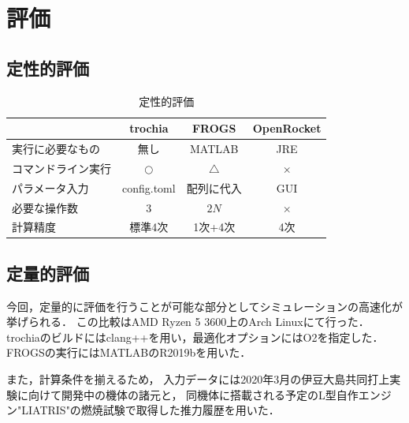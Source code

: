 \documentclass[a4j,10pt]{jsarticle}
\begin{document}


\section{評価}
\subsection{定性的評価}

\begin{table}[htbp]
  \hspace*{-2cm}
  \begin{tabular}{|l|c|c|c|} \hline
         & trochia & FROGS & OpenRocket \\ \hline
	実行に必要なもの & 無し & MATLAB & JRE \\
    コマンドライン実行 & $\bigcirc$ & $\bigtriangleup$ & $\times$ \\
    パラメータ入力 & config.toml & 配列に代入 & GUI \\
	必要な操作数 & $3$ & $2N$ & $\times$ \\
	計算精度 & 標準4次 & 1次+4次 & 4次 \\ \hline
  \end{tabular}
  \caption{定性的評価}
\end{table}

\subsection{定量的評価}

今回，定量的に評価を行うことが可能な部分としてシミュレーションの高速化が挙げられる．
この比較はAMD Ryzen 5 3600上のArch Linuxにて行った．
trochiaのビルドにはclang++を用い，最適化オプションにはO2を指定した．
FROGSの実行にはMATLABのR2019bを用いた．

また，計算条件を揃えるため，
入力データには2020年3月の伊豆大島共同打上実験に向けて開発中の機体の諸元と，
同機体に搭載される予定のL型自作エンジン"LIATRIS"の燃焼試験で取得した推力履歴を用いた．
\end{document}
